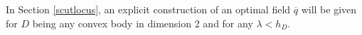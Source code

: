 \documentclass[reqno,11pt]{amsart}
\theoremstyle{definition}
\numberwithin{equation}{section}
\def\ov{\overline}
\DeclareMathOperator{\Div}{div}
\newcommand{\1}{{{\bf 1}\kern-0,28em\rm l}}
\newcommand{\one}{{{\bf 1}\kern-0,28em\rm l}}
\newcommand{\pare}[1]{\left(#1\right)}
\def\l{\lambda}
\begin{document}
%
%
%
%

In Section \ref{scutlocus},  an explicit construction of an optimal field $\ov q$ will be given for $D$ being any convex body in dimension 2 and for any $\l <h_D$.
\end{document}
